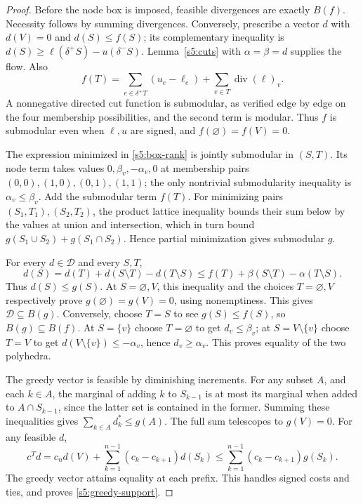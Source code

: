 \begin{proof}
Before the node box is imposed, feasible divergences are exactly $B(f)$.
Necessity follows by summing divergences. Conversely, prescribe a vector
$d$ with $d(V)=0$ and $d(S)\le f(S)$; its complementary inequality is
$d(S)\ge\ell(\delta^+S)-u(\delta^-S)$. Lemma~\ref{s5:cuts} with
$\alpha=\beta=d$ supplies the flow. Also
\[
 f(T)=\sum_{e\in\delta^+T}(u_e-\ell_e)
                         +\sum_{v\in T}\operatorname{div}(\ell)_v.
\]
A nonnegative directed cut function is submodular, as verified edge
by edge on the four membership possibilities, and the second term is
modular. Thus $f$ is submodular even when $\ell,u$ are signed, and
$f(\varnothing)=f(V)=0$.

The expression minimized in \eqref{s5:box-rank} is jointly submodular
in $(S,T)$. Its node term takes values $0,\beta_v,-\alpha_v,0$ at
membership pairs $(0,0),(1,0),(0,1),(1,1)$; the only nontrivial
submodularity inequality is $\alpha_v\le\beta_v$. Add the submodular
term $f(T)$. For minimizing pairs $(S_1,T_1),(S_2,T_2)$, the product
lattice inequality bounds their sum below by the values at union and
intersection, which in turn bound $g(S_1\cup S_2)+g(S_1\cap S_2)$.
Hence partial minimization gives submodular $g$.

For every $d\in\mathcal D$ and every $S,T$,
\[
 d(S)=d(T)+d(S\setminus T)-d(T\setminus S)
       \le f(T)+\beta(S\setminus T)-\alpha(T\setminus S).
\]
Thus $d(S)\le g(S)$. At $S=\varnothing,V$, this inequality and the
choices $T=\varnothing,V$ respectively prove
$g(\varnothing)=g(V)=0$, using nonemptiness. This gives
$\mathcal D\subseteq B(g)$. Conversely, choose $T=S$ to see
$g(S)\le f(S)$, so $B(g)\subseteq B(f)$. At $S=\{v\}$ choose
$T=\varnothing$ to get $d_v\le\beta_v$; at $S=V\setminus\{v\}$
choose $T=V$ to get $d(V\setminus\{v\})\le-\alpha_v$, hence
$d_v\ge\alpha_v$. This proves equality of the two polyhedra.

The greedy vector is feasible by diminishing
increments. For any subset $A$, and each $k\in A$, the marginal of
adding $k$ to $S_{k-1}$ is at most its marginal when added to
$A\cap S_{k-1}$, since the latter set is contained in the former.
Summing these inequalities gives $\sum_{k\in A}d_k^*\le g(A)$.
The full sum telescopes to $g(V)=0$. For any feasible $d$,
\[
 c^Td=c_n d(V)+\sum_{k=1}^{n-1}(c_k-c_{k+1})d(S_k)
       \le\sum_{k=1}^{n-1}(c_k-c_{k+1})g(S_k).
\]
The greedy vector attains equality at each prefix. This handles signed
costs and ties, and proves \eqref{s5:greedy-support}.
\end{proof}

